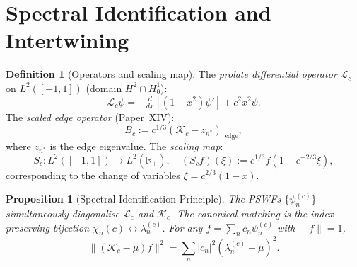 \documentclass[12pt,a4paper]{amsart}
\newtheorem{proposition}[theorem]{Proposition}
\theoremstyle{definition}
\newtheorem{definition}[theorem]{Definition}
\newcommand{\Kc}{\mathcal{K}_c}
\newcommand{\lam}[2]{\lambda_{#2}^{(#1)}}
\newcommand{\Lc}{\mathcal{L}_c}
\newcommand{\norm}[1]{\|#1\|}
\newcommand{\R}{\mathbb{R}}
\begin{document}
\section{Spectral Identification and Intertwining}
\label{sec:specid}

\begin{definition}[Operators and scaling map]
\label{def:ops}
The \emph{prolate differential operator}
$\Lc$ on $L^2([-1,1])$ (domain $H^2\cap H^1_0$):
\[
  \Lc\psi = -\tfrac{d}{dx}[(1-x^2)\psi'] + c^2x^2\psi.
\]
The \emph{scaled edge operator} (Paper~XIV):
\[
  B_c := c^{1/3}(\Kc - z_{n^*})|_{\mathrm{edge}},
\]
where $z_{n^*}$ is the edge eigenvalue.
The \emph{scaling map}:
\begin{equation}\label{eq:Sc}
  S_c\colon L^2([-1,1])\to L^2(\R_+),
  \quad (S_cf)(\xi) := c^{1/3}f(1 - c^{-2/3}\xi),
\end{equation}
corresponding to the change of variables $\xi = c^{2/3}(1-x)$.
\end{definition}

\begin{proposition}[Spectral Identification Principle]
\label{prop:specid}
The PSWFs $\{\psi_n^{(c)}\}$ simultaneously diagonalise
$\Lc$ and $\Kc$. The canonical matching is the
index-preserving bijection $\chi_n(c)\leftrightarrow\lam{c}{n}$.
For any $f=\sum_n c_n\psi_n^{(c)}$ with $\norm{f}=1$,
\begin{equation}\label{eq:specid}
  \norm{(\Kc-\mu)f}^2 = \sum_n|c_n|^2(\lam{c}{n}-\mu)^2.
\end{equation}
\end{proposition}
\end{document}

